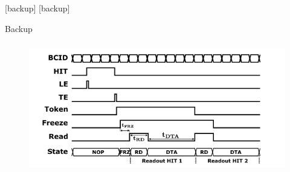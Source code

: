 [backup]
[backup]





    \begin{frame}[noframenumbering]
        Backup        
    \end{frame} 





    \begin{frame}[noframenumbering]
        \frametitle{}
        \begin{figure}[h!]
            \centering
            \includegraphics[width=.8\linewidth]{figures/Monopix1/readout_timing.png}
        \end{figure}
    \end{frame} 

